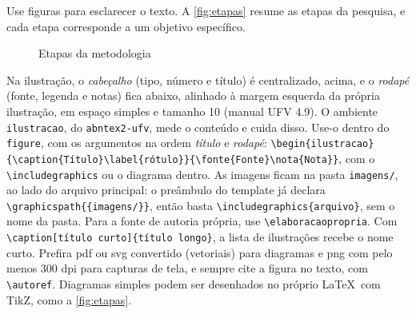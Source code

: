 Use figuras para esclarecer o texto. A \autoref{fig:etapas} resume as etapas da
pesquisa, e cada etapa corresponde a um objetivo específico.

\begin{figure}[htbp]
  \begin{ilustracao}{\caption{Etapas da metodologia}\label{fig:etapas}}{\elaboracaopropria}
  \end{ilustracao}
\end{figure}

\begin{dica}
Na ilustração, o \emph{cabeçalho} (tipo, número e título) é centralizado, acima, e o
\emph{rodapé} (fonte, legenda e notas) fica abaixo, alinhado à margem esquerda da
própria ilustração, em espaço simples e tamanho 10 (manual UFV 4.9). O ambiente
\texttt{ilustracao}, do \texttt{abntex2-ufv}, mede o conteúdo e cuida disso. Use-o dentro
do \texttt{figure}, com os argumentos na ordem \emph{título} e \emph{rodapé}:
\texttt{\textbackslash begin\{ilustracao\}\allowbreak\{\textbackslash caption\{Título\}\allowbreak\textbackslash label\{rótulo\}\}\allowbreak\{\textbackslash fonte\{Fonte\}\allowbreak\textbackslash nota\{Nota\}\}},
com o \texttt{\textbackslash includegraphics} ou o diagrama dentro. As imagens ficam na
pasta \texttt{imagens/}, ao lado do arquivo principal: o preâmbulo do template já declara
\texttt{\textbackslash graphicspath\{\{imagens/\}\}}, então basta
\texttt{\textbackslash includegraphics\{arquivo\}}, sem o nome da pasta. Para a fonte de autoria
própria, use \texttt{\textbackslash elaboracaopropria}. Com
\texttt{\textbackslash caption[título curto]\{título longo\}}, a lista de ilustrações
recebe o nome curto. Prefira \ac{pdf} ou \ac{svg} convertido (vetoriais) para diagramas e
\ac{png} com pelo menos 300 dpi para capturas de tela, e sempre cite a figura no texto,
com \texttt{\textbackslash autoref}. Diagramas simples podem ser desenhados no próprio
\LaTeX\ com TikZ, como a \autoref{fig:etapas}.
\end{dica}

